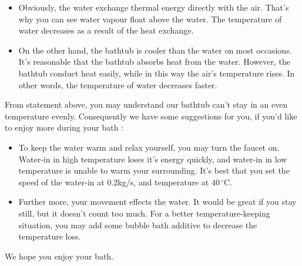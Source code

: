 \documentclass[12pt,a4paper,titlepage]{article}
\begin{document}
\begin{itemize}
\item Obviously, the water exchange thermal energy directly with the air. That's why you can see water vapour float above the water. The temperature of water decreases as a result of the heat exchange.
\item On the other hand, the bathtub is cooler than the water on most occasions. It's reasonable that the bathtub absorbs heat from the water. However, the bathtub conduct heat easily, while in this way the air's temperature rises. In other words, the temperature of water decreases faster.
\end{itemize}
From statement above, you may understand our bathtub can't stay in an even temperature evenly. Consequently we have some suggestions for you, if you'd like to enjoy more during your bath :
\begin{itemize}
\item To keep the water warm and relax yourself, you may turn the faucet on. Water-in in high temperature loses it's energy quickly, and water-in in low temperature is unable to warm your surrounding. It's best that you set the speed of the water-in at 0.2kg/s, and temperature at $40\,^{\circ}\mathrm{C}$.
\item Further more, your movement effects the water. It would be great if you stay still, but it doesn't count too much. For a better temperature-keeping situation, you may add some bubble bath additive to decrease the temperature loss.
\end{itemize}
We hope you enjoy your bath.
\end{document}
